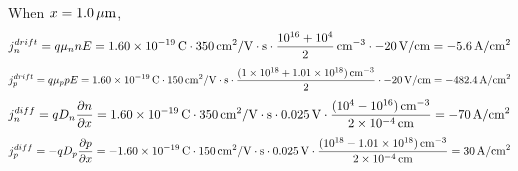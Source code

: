 \documentclass{article}
\newcommand{\unit}[1]{{\rm\,#1}}
\begin{document}
When $x=1.0\unit{\mu m}$,
$$j_n^{drift}=q\mu_nnE=1.60\times10^{-19}\unit{C}\cdot350\unit{cm^2/V\cdot s}\cdot\frac{10^{16}+10^4}{2}\unit{cm^{-3}}\cdot-20\unit{V/cm}=-5.6\unit{A/cm^2}$$
$$j_p^{drift}=q\mu_ppE=1.60\times10^{-19}\unit{C}\cdot150\unit{cm^2/V\cdot s}\cdot\frac{(1\times10^{18}+1.01\times10^{18})\unit{cm^{-3}}}{2}\cdot-20\unit{V/cm}=-482.4\unit{A/cm^2}$$
$$j_n^{diff}=qD_n\frac{\partial n}{\partial x}=1.60\times10^{-19}\unit{C}\cdot350\unit{cm^2/V\cdot s}\cdot0.025\unit{V}\cdot\frac{(10^4-10^{16})\unit{cm^{-3}}}{2\times10^{-4}\unit{cm}}=-70\unit{A/cm^2}$$
$$j_p^{diff}=-qD_p\frac{\partial p}{\partial x}=-1.60\times10^{-19}\unit{C}\cdot150\unit{cm^2/V\cdot s}\cdot0.025\unit{V}\cdot\frac{(10^{18}-1.01\times10^{18})\unit{cm^{-3}}}{2\times10^{-4}\unit{cm}}=30\unit{A/cm^2}$$
\end{document}
